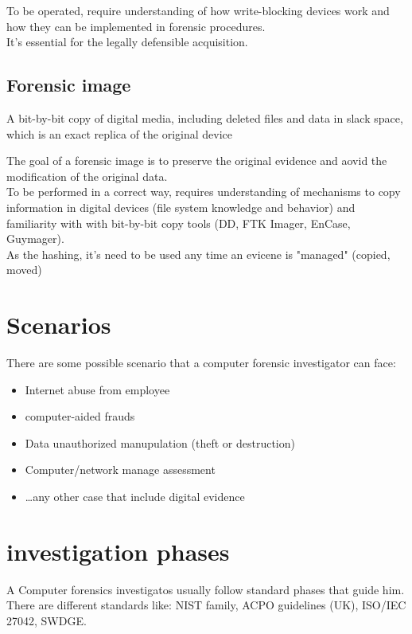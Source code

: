 To be operated, require understanding of how write-blocking devices work 
and how they can be implemented in forensic procedures. \\ 

It's essential for the legally defensible acquisition.


\subsection{Forensic image}

\begin{boxH}
    A bit-by-bit copy of digital media, including deleted files and 
    data in slack space, which is an exact replica of the original device
\end{boxH}

The goal of a forensic image is to preserve the original evidence and aovid the modification
of the original data. \\

To be performed in a correct way, requires understanding of mechanisms to copy information 
in digital devices (file system knowledge and behavior) and familiarity with  with bit-by-bit copy tools
(DD, FTK Imager, EnCase, Guymager). \\

As the hashing, it's need to be used any time an evicene is "managed" (copied, moved)

\section{Scenarios}
There are some possible scenario that a computer forensic investigator can face:
\begin{itemize}[itemsep=0pt]
    \item Internet abuse from employee
    \item computer-aided frauds
    \item Data unauthorized manupulation (theft or destruction)
    \item Computer/network manage assessment
    \item \dots any other case that include digital evidence
\end{itemize}

\section{investigation phases}

A Computer forensics investigatos usually follow standard phases that guide him. There are different standards like: NIST family, ACPO guidelines (UK), ISO/IEC 27042, SWDGE.

